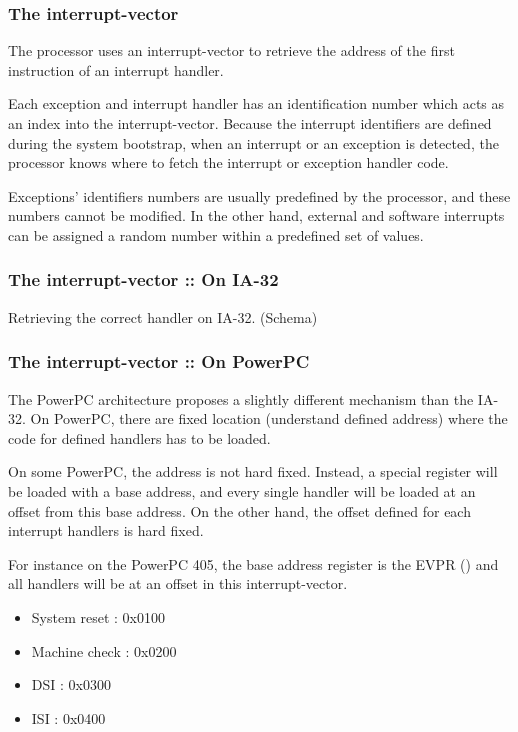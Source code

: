 
\begin{frame}
  \frametitle{The interrupt-vector}

The processor uses an interrupt-vector to retrieve the address of the first instruction of an interrupt handler.

\-

Each exception and interrupt handler has an identification number which acts as an index into the interrupt-vector. Because the interrupt identifiers are defined during the system bootstrap, when an interrupt or an exception is detected, the processor knows where to fetch the interrupt or exception handler code.

\-

Exceptions' identifiers numbers are usually predefined by the processor, and these numbers cannot be modified. In the other hand, external and software interrupts can be assigned a random number within a predefined set of values. 

\end{frame}


\begin{frame}
  \frametitle{The interrupt-vector :: On IA-32}

Retrieving the correct handler on IA-32. (Schema)

\end{frame}


\begin{frame}
  \frametitle{The interrupt-vector :: On PowerPC}

The PowerPC architecture proposes a slightly different mechanism than the IA-32. On PowerPC, there are fixed location (understand defined address) where the code for defined handlers has to be loaded.

\-

On some PowerPC, the address is not hard fixed. Instead, a special register will be loaded with a base address, and every single handler will be loaded at an offset from this base address. On the other hand, the offset defined for each interrupt handlers is hard fixed.

\-

For instance on the PowerPC 405, the base address register is the EVPR () and all handlers will be at an offset in this interrupt-vector.

\begin{itemize}
\item
System reset : 0x0100
\item
Machine check : 0x0200
\item
DSI : 0x0300
\item
ISI : 0x0400
\end{itemize}

\end{frame}

